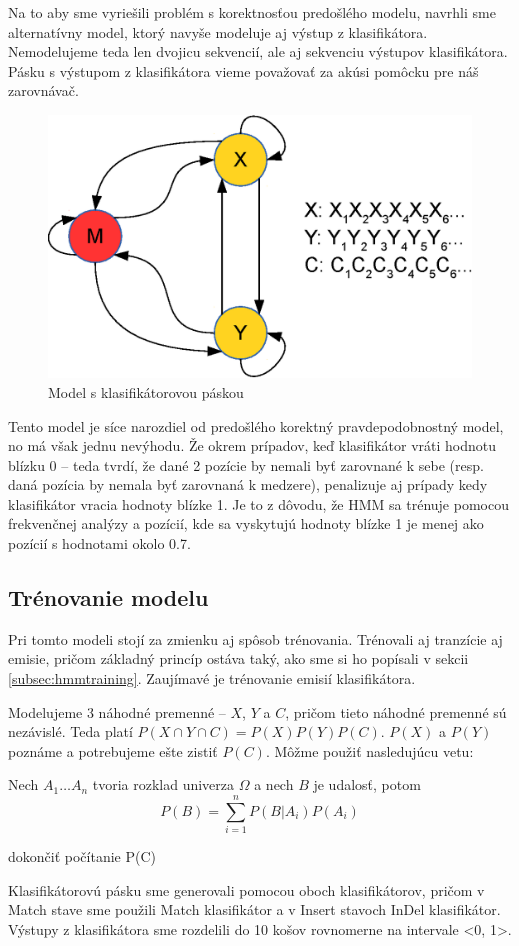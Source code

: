 Na to aby sme vyriešili problém s korektnosťou predošlého modelu, navrhli sme alternatívny model, ktorý navyše modeluje aj výstup z klasifikátora.
Nemodelujeme teda len dvojicu sekvencií, ale aj sekvenciu výstupov klasifikátora.
Pásku s výstupom z klasifikátora vieme považovať za akúsi pomôcku pre náš zarovnávač.

\begin{figure}[htp]
    \centering
    \includegraphics[width=.5\textwidth]{images/model_clf_paska}
    \caption{Model s klasifikátorovou páskou}
\end{figure}


Tento model je síce narozdiel od predošlého korektný pravdepodobnostný model, no má však jednu nevýhodu. Že okrem prípadov, keď klasifikátor vráti hodnotu blízku 0 -- teda tvrdí, že dané 2 pozície by nemali byť zarovnané k sebe (resp. daná pozícia by nemala byť zarovnaná k medzere), penalizuje aj prípady kedy klasifikátor vracia hodnoty blízke 1. Je to z dôvodu, že HMM sa trénuje pomocou frekvenčnej analýzy a pozícií, kde sa vyskytujú hodnoty blízke 1 je menej ako pozícií s hodnotami okolo 0.7.


\subsection{Trénovanie modelu} %
Pri tomto modeli stojí za zmienku aj spôsob trénovania.
Trénovali aj tranzície aj emisie, pričom základný princíp ostáva taký, ako sme si ho popísali v sekcii \ref{subsec:hmmtraining}.
Zaujímavé je trénovanie emisií klasifikátora.

Modelujeme 3 náhodné premenné -- $X$, $Y$ a $C$, pričom tieto náhodné premenné sú nezávislé. Teda platí $P(X \cap Y \cap C) = P(X)P(Y)P(C)$.
$P(X)$ a $P(Y)$ poznáme a potrebujeme ešte zistiť $P(C)$.
Môžme použiť nasledujúcu vetu:

\begin{vt}
Nech $A_1\dots A_n$ tvoria rozklad univerza $\Omega$ a nech $B$ je udalosť, potom
$$P(B) = \sum_{i=1}^n P(B|A_i)P(A_i)$$
\end{vt}


\todo dokončiť počítanie P(C)

Klasifikátorovú pásku sme generovali pomocou oboch klasifikátorov, pričom v Match stave sme použili Match klasifikátor a v Insert stavoch InDel klasifikátor.
Výstupy z klasifikátora sme rozdelili do 10 košov rovnomerne na intervale <0, 1>.


